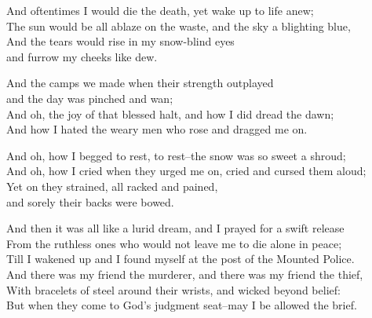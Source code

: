 \begin{poemblock}
And oftentimes I would die the death, yet wake up to life anew;\\
The sun would be all ablaze on the waste, and the sky a blighting blue,\\
And the tears would rise in my snow-blind eyes\\
\idt and furrow my cheeks like dew.

And the camps we made when their strength outplayed\\
\idt and the day was pinched and wan;\\
And oh, the joy of that blessed halt, and how I did dread the dawn;\\
And how I hated the weary men who rose and dragged me on.

And oh, how I begged to rest, to rest--the snow was so sweet a shroud;\\
And oh, how I cried when they urged me on, cried and cursed them aloud;\\
Yet on they strained, all racked and pained,\\
\idt and sorely their backs were bowed.

And then it was all like a lurid dream, and I prayed for a swift release\\
From the ruthless ones who would not leave me to die alone in peace;\\
Till I wakened up and I found myself at the post of the Mounted Police.\\

And there was my friend the murderer, and there was my friend the thief,\\
With bracelets of steel around their wrists, and wicked beyond belief:\\
But when they come to God's judgment seat--may I be allowed the brief.
\end{poemblock}
